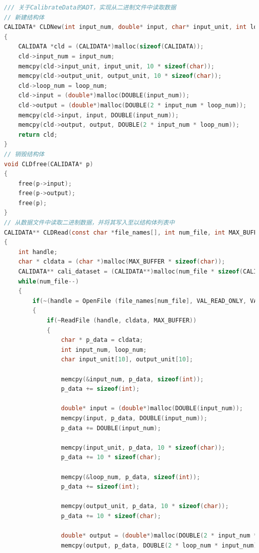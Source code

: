 \documentclass[a4paper,12pt,twoside]{article}%
\begin{document}
\newpage
\appendix
\appendixpage
\addappheadtotoc
{}
\begin{lstlisting}[language=C]
/// 关于CalibrateData的ADT，实现从二进制文件中读取数据
// 新建结构体
CALIDATA* CLDNew(int input_num, double* input, char* input_unit, int loop_num, char* output_unit, double* output)
{
	CALIDATA *cld = (CALIDATA*)malloc(sizeof(CALIDATA));
	cld->input_num = input_num;
	memcpy(cld->input_unit, input_unit, 10 * sizeof(char));
	memcpy(cld->output_unit, output_unit, 10 * sizeof(char));
	cld->loop_num = loop_num;
	cld->input = (double*)malloc(DOUBLE(input_num));
	cld->output = (double*)malloc(DOUBLE(2 * input_num * loop_num));
	memcpy(cld->input, input, DOUBLE(input_num));
	memcpy(cld->output, output, DOUBLE(2 * input_num * loop_num));
	return cld;
}
// 销毁结构体
void CLDfree(CALIDATA* p)
{
	free(p->input);
	free(p->output);
	free(p);
}
// 从数据文件中读取二进制数据，并将其写入至以结构体列表中
CALIDATA** CLDRead(const char *file_names[], int num_file, int MAX_BUFFER)
{
	int handle;
	char * cldata = (char *)malloc(MAX_BUFFER * sizeof(char));
	CALIDATA** cali_dataset = (CALIDATA**)malloc(num_file * sizeof(CALIDATA*));
	while(num_file--)
	{
		if(~(handle = OpenFile (file_names[num_file], VAL_READ_ONLY, VAL_OPEN_AS_IS, VAL_BINARY)))
		{
			if(~ReadFile (handle, cldata, MAX_BUFFER))
			{
				char * p_data = cldata;
				int input_num, loop_num;
				char input_unit[10], output_unit[10];
				
				memcpy(&input_num, p_data, sizeof(int));
				p_data += sizeof(int);
				
				double* input = (double*)malloc(DOUBLE(input_num));
				memcpy(input, p_data, DOUBLE(input_num));
				p_data += DOUBLE(input_num);
				
				memcpy(input_unit, p_data, 10 * sizeof(char));
				p_data += 10 * sizeof(char);
				
				memcpy(&loop_num, p_data, sizeof(int));
				p_data += sizeof(int);
				
				memcpy(output_unit, p_data, 10 * sizeof(char));
				p_data += 10 * sizeof(char);
				
				double* output = (double*)malloc(DOUBLE(2 * input_num * loop_num));
				memcpy(output, p_data, DOUBLE(2 * loop_num * input_num));
				

\end{lstlisting}
\end{document}
